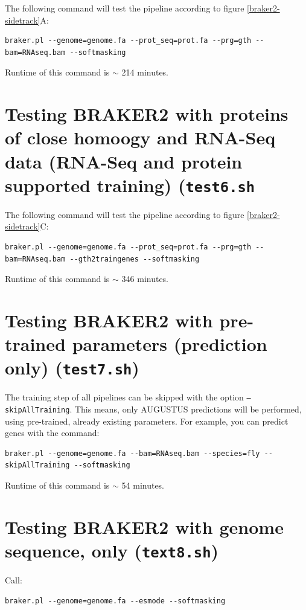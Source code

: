 \documentclass[a4paper,10pt]{report}
\begin{document}
The following command will test the pipeline according to figure \ref{braker2-sidetrack}A:

\begin{verbatim}
braker.pl --genome=genome.fa --prot_seq=prot.fa --prg=gth --bam=RNAseq.bam --softmasking
\end{verbatim}

Runtime of this command is $\sim$ 214 minutes.

\section{Testing BRAKER2 with proteins of close homoogy and RNA-Seq data (RNA-Seq and protein supported training) (\texttt{test6.sh}}

The following command will test the pipeline according to figure \ref{braker2-sidetrack}C:

\begin{verbatim}
braker.pl --genome=genome.fa --prot_seq=prot.fa --prg=gth --bam=RNAseq.bam --gth2traingenes --softmasking
\end{verbatim}

Runtime of this command is $\sim$ 346 minutes.

\section{Testing BRAKER2 with pre-trained parameters (prediction only) (\texttt{test7.sh})}

The training step of all pipelines can be skipped with the option \texttt{--skipAllTraining}. This means, only AUGUSTUS predictions will be performed, using pre-trained, already existing parameters. For example, you can predict genes with the command:

\begin{verbatim}
braker.pl --genome=genome.fa --bam=RNAseq.bam --species=fly --skipAllTraining --softmasking
\end{verbatim}

Runtime of this command is $\sim$ 54 minutes.

\section{Testing BRAKER2 with genome sequence, only (\texttt{text8.sh})}

Call:

\begin{verbatim}
braker.pl --genome=genome.fa --esmode --softmasking
\end{verbatim}
\end{document}
